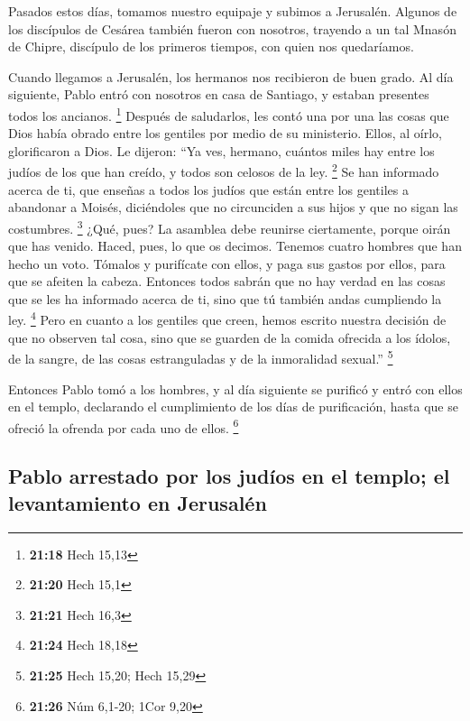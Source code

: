  Pasados estos días, tomamos nuestro equipaje y subimos a
Jerusalén.  Algunos de los discípulos de Cesárea también
fueron con nosotros, trayendo a un tal Mnasón de Chipre, discípulo de
los primeros tiempos, con quien nos quedaríamos.

 Cuando llegamos a Jerusalén, los hermanos nos recibieron
de buen grado.  Al día siguiente, Pablo entró con
nosotros en casa de Santiago, y estaban presentes todos los ancianos.
\footnote{\textbf{21:18} Hech 15,13}  Después de
saludarlos, les contó una por una las cosas que Dios había obrado entre
los gentiles por medio de su ministerio.  Ellos, al
oírlo, glorificaron a Dios. Le dijeron: ``Ya ves, hermano, cuántos miles
hay entre los judíos de los que han creído, y todos son celosos de la
ley. \footnote{\textbf{21:20} Hech 15,1}  Se han
informado acerca de ti, que enseñas a todos los judíos que están entre
los gentiles a abandonar a Moisés, diciéndoles que no circunciden a sus
hijos y que no sigan las costumbres. \footnote{\textbf{21:21} Hech 16,3}
 ¿Qué, pues? La asamblea debe reunirse ciertamente,
porque oirán que has venido.  Haced, pues, lo que os
decimos. Tenemos cuatro hombres que han hecho un voto. 
Tómalos y purifícate con ellos, y paga sus gastos por ellos, para que se
afeiten la cabeza. Entonces todos sabrán que no hay verdad en las cosas
que se les ha informado acerca de ti, sino que tú también andas
cumpliendo la ley. \footnote{\textbf{21:24} Hech 18,18} 
Pero en cuanto a los gentiles que creen, hemos escrito nuestra decisión
de que no observen tal cosa, sino que se guarden de la comida ofrecida a
los ídolos, de la sangre, de las cosas estranguladas y de la inmoralidad
sexual.'' \footnote{\textbf{21:25} Hech 15,20; Hech 15,29}

 Entonces Pablo tomó a los hombres, y al día siguiente se
purificó y entró con ellos en el templo, declarando el cumplimiento de
los días de purificación, hasta que se ofreció la ofrenda por cada uno
de ellos. \footnote{\textbf{21:26} Núm 6,1-20; 1Cor 9,20}

\hypertarget{pablo-arrestado-por-los-juduxedos-en-el-templo-el-levantamiento-en-jerusaluxe9n}{%
\subsection{Pablo arrestado por los judíos en el templo; el
levantamiento en
Jerusalén}\label{pablo-arrestado-por-los-juduxedos-en-el-templo-el-levantamiento-en-jerusaluxe9n}}

